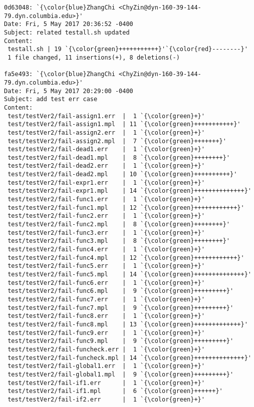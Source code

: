 \begin{lstlisting}
0d63048: `{\color{blue}ZhangChi <ChyZin@dyn-160-39-144-79.dyn.columbia.edu>}'
Date: Fri, 5 May 2017 20:36:52 -0400
Subject: related testall.sh updated
Content: 
 testall.sh | 19 `{\color{green}+++++++++++}'`{\color{red}--------}'
 1 file changed, 11 insertions(+), 8 deletions(-)

fa5e493: `{\color{blue}ZhangChi <ChyZin@dyn-160-39-144-79.dyn.columbia.edu>}'
Date: Fri, 5 May 2017 20:29:00 -0400
Subject: add test err case
Content: 
 test/testVer2/fail-assign1.err  |  1 `{\color{green}+}'
 test/testVer2/fail-assign1.mpl  | 11 `{\color{green}+++++++++++}'
 test/testVer2/fail-assign2.err  |  1 `{\color{green}+}'
 test/testVer2/fail-assign2.mpl  |  7 `{\color{green}+++++++}'
 test/testVer2/fail-dead1.err    |  1 `{\color{green}+}'
 test/testVer2/fail-dead1.mpl    |  8 `{\color{green}++++++++}'
 test/testVer2/fail-dead2.err    |  1 `{\color{green}+}'
 test/testVer2/fail-dead2.mpl    | 10 `{\color{green}++++++++++}'
 test/testVer2/fail-expr1.err    |  1 `{\color{green}+}'
 test/testVer2/fail-expr1.mpl    | 14 `{\color{green}++++++++++++++}'
 test/testVer2/fail-func1.err    |  1 `{\color{green}+}'
 test/testVer2/fail-func1.mpl    | 12 `{\color{green}++++++++++++}'
 test/testVer2/fail-func2.err    |  1 `{\color{green}+}'
 test/testVer2/fail-func2.mpl    |  8 `{\color{green}++++++++}'
 test/testVer2/fail-func3.err    |  1 `{\color{green}+}'
 test/testVer2/fail-func3.mpl    |  8 `{\color{green}++++++++}'
 test/testVer2/fail-func4.err    |  1 `{\color{green}+}'
 test/testVer2/fail-func4.mpl    | 12 `{\color{green}++++++++++++}'
 test/testVer2/fail-func5.err    |  1 `{\color{green}+}'
 test/testVer2/fail-func5.mpl    | 14 `{\color{green}++++++++++++++}'
 test/testVer2/fail-func6.err    |  1 `{\color{green}+}'
 test/testVer2/fail-func6.mpl    |  9 `{\color{green}+++++++++}'
 test/testVer2/fail-func7.err    |  1 `{\color{green}+}'
 test/testVer2/fail-func7.mpl    |  9 `{\color{green}+++++++++}'
 test/testVer2/fail-func8.err    |  1 `{\color{green}+}'
 test/testVer2/fail-func8.mpl    | 13 `{\color{green}+++++++++++++}'
 test/testVer2/fail-func9.err    |  1 `{\color{green}+}'
 test/testVer2/fail-func9.mpl    |  9 `{\color{green}+++++++++}'
 test/testVer2/fail-funcheck.err |  1 `{\color{green}+}'
 test/testVer2/fail-funcheck.mpl | 14 `{\color{green}++++++++++++++}'
 test/testVer2/fail-global1.err  |  1 `{\color{green}+}'
 test/testVer2/fail-global1.mpl  |  9 `{\color{green}+++++++++}'
 test/testVer2/fail-if1.err      |  1 `{\color{green}+}'
 test/testVer2/fail-if1.mpl      |  6 `{\color{green}++++++}'
 test/testVer2/fail-if2.err      |  1 `{\color{green}+}'

\end{lstlisting}
